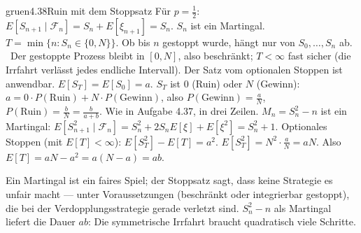 \begin{loesungkarte}{gruen}{4.38}{Ruin mit dem Stoppsatz}
Für $p = \frac12$: $E[S_{n+1}\mid\mathcal F_n] = S_n + E[\xi_{n+1}] = S_n$. $S_n$ ist ein Martingal.
$T = \min\{n\colon S_n\in\{0, N\}\}$. Ob bis $n$ gestoppt wurde, hängt nur von $S_0, \dots, S_n$ ab. \checkmark\ Der gestoppte Prozess bleibt in $[0, N]$, also beschränkt; $T < \infty$ fast sicher (die Irrfahrt verlässt jedes endliche Intervall). Der Satz vom optionalen Stoppen ist anwendbar.
$E[S_T] = E[S_0] = a$. $S_T$ ist $0$ (Ruin) oder $N$ (Gewinn): $a = 0\cdot P(\text{Ruin}) + N\cdot P(\text{Gewinn})$, also $P(\text{Gewinn}) = \frac aN$, $P(\text{Ruin}) = \frac bN = \frac b{a + b}$. Wie in Aufgabe 4.37, in drei Zeilen.
$M_n = S_n^{2} - n$ ist ein Martingal: $E[S_{n+1}^{2}\mid\mathcal F_n] = S_n^{2} + 2S_nE[\xi] + E[\xi^{2}] = S_n^{2} + 1$. Optionales Stoppen (mit $E[T] < \infty$): $E[S_T^{2}] - E[T] = a^{2}$. $E[S_T^{2}] = N^{2}\cdot\frac aN = aN$. Also $E[T] = aN - a^{2} = a(N - a) = ab$.
\begin{mitnehmen}\kastentext
Ein Martingal ist ein faires Spiel; der Stoppsatz sagt, dass keine Strategie es unfair macht --- unter Voraussetzungen (beschränkt oder integrierbar gestoppt), die bei der Verdopplungsstrategie gerade verletzt sind. $S_n^{2} - n$ als Martingal liefert die Dauer $ab$: Die symmetrische Irrfahrt braucht quadratisch viele Schritte.
\end{mitnehmen}
\end{loesungkarte}

